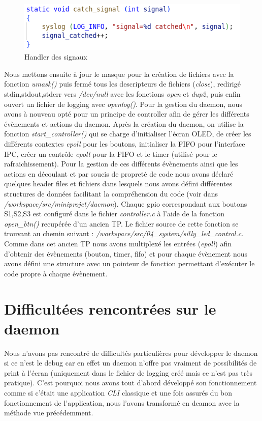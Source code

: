 \documentclass{ReportTemplate}
\begin{document}
\begin{figure}[H]
    \centering
    \includegraphics[width=\textwidth]{imageSources/catch_signal.png}
    \caption{Handler des signaux}
    \label{fig:CatchSignal}
\end{figure}
\newpage
Nous mettons ensuite à jour le masque pour la création de fichiers
avec la fonction \textit{umask()} puis fermé tous les descripteurs de
fichiers (\textit{close}), redirigé stdin,stdout,stderr vers \textit{/dev/null}
avec les fonctions \textit{open} et \textit{dup2}, puis enfin ouvert un fichier
de logging avec \textit{openlog()}.\newline
Pour la gestion du daemon, nous avons à nouveau opté pour un principe de
controller afin de gérer les différents évènements et actions du daemon. Après
la création du daemon, on utilise la fonction \textit{start\_controller()} qui se charge d'initialiser l'écran OLED, de créer les différents contextes
\textit{epoll} pour les boutons, initialiser la FIFO pour l'interface IPC, créer
un contrôle \textit{epoll} pour la FIFO et le timer (utilisé pour le
rafraichissement).\newline
Pour la gestion de ces différents évènements ainsi que les actions en découlant
et par soucis de propreté de code nous avons déclaré quelques header files et
fichiers dans lesquels nous avons défini différentes structures de données
facilitant la compréhension du code (voir dans
\textit{/workspace/src/miniprojet/daemon}).\newline
Chaque gpio correspondant aux boutons S1,S2,S3 est configuré dans le fichier
\textit{controller.c} à l'aide de la fonction \textit{open\_btn()} recupérée
d'un ancien TP. Le fichier source de cette fonction se trouvant au chemin
suivant : \textit{/workspace/src/04\_system/silly\_led\_control.c}. Comme
dans cet ancien TP nous avons multiplexé les entrées (\textit{epoll}) afin
d'obtenir des évènements (bouton, timer, fifo) et pour chaque évènement nous
avons défini une structure avec un pointeur de fonction permettant d'exécuter le
code propre à chaque évènement.\newline
\section{Difficultées rencontrées sur le daemon}
Nous n'avons pas rencontré de difficultés particulières pour développer le
daemon si ce n'est le debug car en effet un daemon n'offre pas vraiment de
possibilités de print à l'écran (uniquement dans le fichier de logging créé mais
ce n'est pas très pratique). C'est pourquoi nous avons tout d'abord développé son
fonctionnement comme si c'était une application \textit{CLI} classique et une fois
assurés du bon fonctionnement de l'application, nous l'avons transformé en
deamon avec la méthode vue précédemment.\newline
\end{document}
